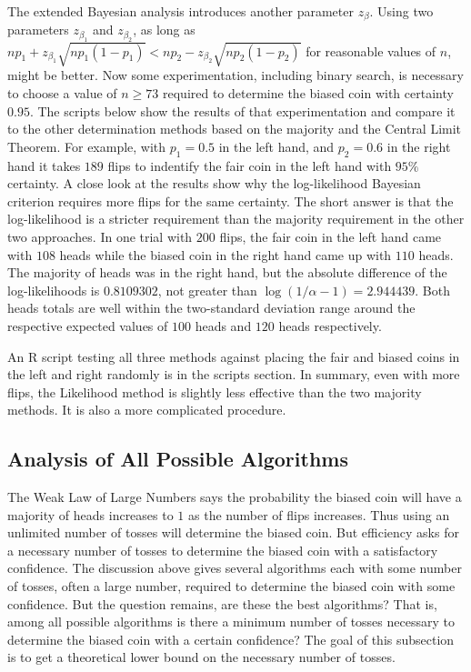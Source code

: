 \documentclass[12pt]{article}
\begin{document}
The extended Bayesian analysis introduces another parameter \( z_{\beta}
\).  Using two parameters \( z_{\beta_1} \) and \( z_{\beta_2} \), as
long as \( np_1+z_{\beta_1}\sqrt{np_1(1-p_1)} < np_2-z_{\beta_2}\sqrt{np_2
(1-p_2)} \) for reasonable values of \( n \), might be better.  Now some
experimentation, including binary search, is necessary to choose a value
of \( n \ge 73 \) required to determine the biased coin with certainty \(
0.95 \).  The scripts below show the results of that experimentation and
compare it to the other determination methods based on the majority and
the Central Limit Theorem.  For example, with \( p_1 = 0.5 \) in the
left hand, and \( p_2 = 0.6 \) in the right hand it takes \( 189 \)
flips to indentify the fair coin in the left hand with \( 95\% \)
certainty.  A close look at the results show why the log-likelihood
Bayesian criterion requires more flips for the same certainty.  The
short answer is that the log-likelihood is a stricter requirement than
the majority requirement in the other two approaches.  In one trial with
\( 200 \) flips, the fair coin in the left hand came with \( 108 \)
heads while the biased coin in the right hand came up with \( 110 \)
heads.  The majority of heads was in the right hand, but the absolute
difference of the log-likelihoods is \( 0.8109302 \), not greater than \(
\log(1/\alpha-1) = 2.944439 \).  Both heads totals are well within the
two-standard deviation range around the respective expected values of \(
100 \) heads and \( 120 \) heads respectively.

An R script testing all three methods against placing the fair and
biased coins in the left and right randomly is in the scripts section.
In summary, even with more flips, the Likelihood method is slightly less
effective than the two majority methods.  It is also a more complicated
procedure.

\subsection*{Analysis of All Possible Algorithms}

The Weak Law of Large Numbers says the probability the biased coin will
have a majority of heads increases to \( 1 \) as the number of flips
increases.  Thus using an unlimited number of tosses will determine the
biased coin.  But efficiency asks for a necessary number of tosses to
determine the biased coin with a satisfactory confidence.  The
discussion above gives several algorithms each with some number of
tosses, often a large number, required to determine the biased coin with
some confidence.  But the question remains, are these the best
algorithms?  That is, among all possible algorithms is there a minimum
number of tosses necessary to determine the biased coin with a certain
confidence?  The goal of this subsection is to get a theoretical lower
bound on the necessary number of tosses.
\end{document}
